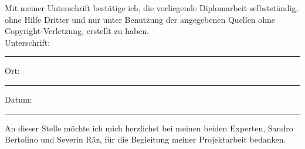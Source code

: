 \documentclass[
  11pt, %
  oneside, %
  ngerman, %
  singlespacing, %
  liststotoc, %
  headsepline, %
]{MastersDoctoralThesis} %
\begin{document}
\blankpage


\null\thispagestyle{empty}\addtocounter{page}{-2}\newpage
\begin{declaration}
  \addchaptertocentry{\authorshipname} %
  \noindent Mit meiner Unterschrift bestätige ich, die vorliegende Diplomarbeit
  selbstständig, ohne Hilfe Dritter und nur unter Benutzung der angegebenen
  Quellen ohne Copyright-Verletzung, erstellt zu haben.\\

  \noindent Unterschrift:\\
  \rule[0.5em]{25em}{0.5pt}

  \noindent Ort:\\
  \rule[0.5em]{25em}{0.5pt}

  \noindent Datum:\\
  \rule[0.5em]{25em}{0.5pt}
\end{declaration}

\cleardoublepage


\begin{acknowledgements}
  \addchaptertocentry{\acknowledgementname} %

  An dieser Stelle möchte ich mich herzlichst bei meinen beiden Experten,
  Sandro Bertolino und Severin Räz, für die Begleitung meiner Projektarbeit
  bedanken.
\end{acknowledgements}


\tableofcontents %

\listoffigures %

\listoftables %

\end{document}
